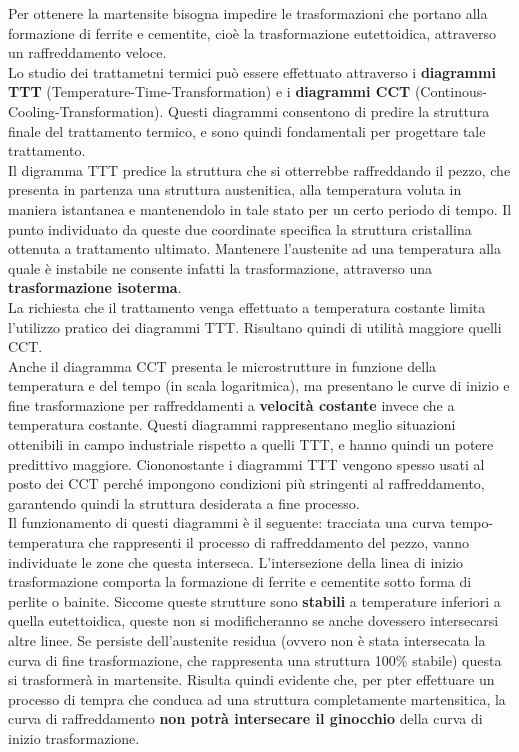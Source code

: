 Per ottenere la martensite bisogna impedire le trasformazioni che portano alla formazione di ferrite e cementite, cioè la trasformazione eutettoidica, attraverso un raffreddamento veloce.\\
Lo studio dei trattametni termici può essere effettuato attraverso i \textbf{diagrammi TTT} (Temperature-Time-Transformation) e i \textbf{diagrammi CCT} (Continous-Cooling-Transformation). Questi diagrammi consentono di predire la struttura finale del trattamento termico, e sono quindi fondamentali per progettare tale trattamento.\\
Il digramma TTT predice la struttura che si otterrebbe raffreddando il pezzo, che presenta in partenza una struttura austenitica, alla temperatura voluta in maniera istantanea e mantenendolo in tale stato per un certo periodo di tempo. Il punto individuato da queste due coordinate specifica la struttura cristallina ottenuta a trattamento ultimato. Mantenere l'austenite ad una temperatura alla quale è instabile ne consente infatti la trasformazione, attraverso una \textbf{trasformazione isoterma}.\\
La richiesta che il trattamento venga effettuato a temperatura costante limita l'utilizzo pratico dei diagrammi TTT. Risultano quindi di utilità maggiore quelli CCT.\\
Anche il diagramma CCT presenta le microstrutture in funzione della temperatura e del tempo (in scala logaritmica), ma presentano le curve di inizio e fine trasformazione per raffreddamenti a \textbf{velocità costante} invece che a temperatura costante. Questi diagrammi rappresentano meglio situazioni ottenibili in campo industriale rispetto a quelli TTT, e hanno quindi un potere predittivo maggiore. Ciononostante i diagrammi TTT vengono spesso usati al posto dei CCT perché impongono condizioni più stringenti al raffreddamento, garantendo quindi la struttura desiderata a fine processo.\\
Il funzionamento di questi diagrammi è il seguente: tracciata una curva tempo-temperatura che rappresenti il processo di raffreddamento del pezzo, vanno individuate le zone che questa interseca. L'intersezione della linea di inizio trasformazione comporta la formazione di ferrite e cementite sotto forma di perlite o bainite. Siccome queste strutture sono \textbf{stabili} a temperature inferiori a quella eutettoidica, queste non si modificheranno se anche dovessero intersecarsi altre linee. Se persiste dell'austenite residua (ovvero non è stata intersecata la curva di fine trasformazione, che rappresenta una struttura 100\% stabile) questa si trasformerà in martensite. Risulta quindi evidente che, per pter effettuare un processo di tempra che conduca ad una struttura completamente martensitica, la curva di raffreddamento \textbf{non potrà intersecare il ginocchio} della curva di inizio trasformazione.
